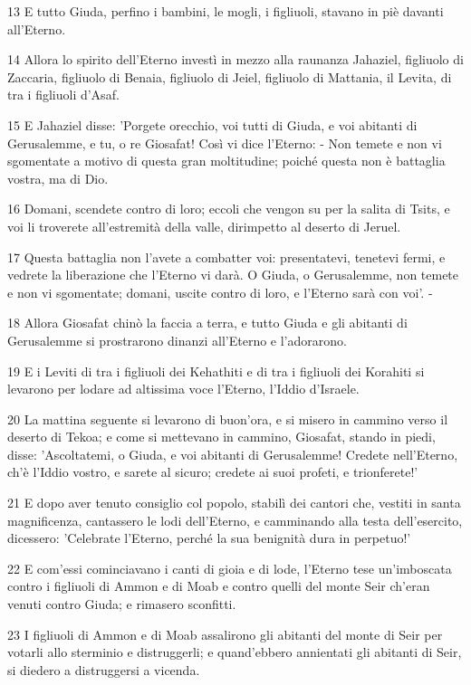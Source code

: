 \par 13 E tutto Giuda, perfino i bambini, le mogli, i figliuoli, stavano in piè davanti all'Eterno.
\par 14 Allora lo spirito dell'Eterno investì in mezzo alla raunanza Jahaziel, figliuolo di Zaccaria, figliuolo di Benaia, figliuolo di Jeiel, figliuolo di Mattania, il Levita, di tra i figliuoli d'Asaf.
\par 15 E Jahaziel disse: 'Porgete orecchio, voi tutti di Giuda, e voi abitanti di Gerusalemme, e tu, o re Giosafat! Così vi dice l'Eterno: - Non temete e non vi sgomentate a motivo di questa gran moltitudine; poiché questa non è battaglia vostra, ma di Dio.
\par 16 Domani, scendete contro di loro; eccoli che vengon su per la salita di Tsits, e voi li troverete all'estremità della valle, dirimpetto al deserto di Jeruel.
\par 17 Questa battaglia non l'avete a combatter voi: presentatevi, tenetevi fermi, e vedrete la liberazione che l'Eterno vi darà. O Giuda, o Gerusalemme, non temete e non vi sgomentate; domani, uscite contro di loro, e l'Eterno sarà con voi'. -
\par 18 Allora Giosafat chinò la faccia a terra, e tutto Giuda e gli abitanti di Gerusalemme si prostrarono dinanzi all'Eterno e l'adorarono.
\par 19 E i Leviti di tra i figliuoli dei Kehathiti e di tra i figliuoli dei Korahiti si levarono per lodare ad altissima voce l'Eterno, l'Iddio d'Israele.
\par 20 La mattina seguente si levarono di buon'ora, e si misero in cammino verso il deserto di Tekoa; e come si mettevano in cammino, Giosafat, stando in piedi, disse: 'Ascoltatemi, o Giuda, e voi abitanti di Gerusalemme! Credete nell'Eterno, ch'è l'Iddio vostro, e sarete al sicuro; credete ai suoi profeti, e trionferete!'
\par 21 E dopo aver tenuto consiglio col popolo, stabilì dei cantori che, vestiti in santa magnificenza, cantassero le lodi dell'Eterno, e camminando alla testa dell'esercito, dicessero: 'Celebrate l'Eterno, perché la sua benignità dura in perpetuo!'
\par 22 E com'essi cominciavano i canti di gioia e di lode, l'Eterno tese un'imboscata contro i figliuoli di Ammon e di Moab e contro quelli del monte Seir ch'eran venuti contro Giuda; e rimasero sconfitti.
\par 23 I figliuoli di Ammon e di Moab assalirono gli abitanti del monte di Seir per votarli allo sterminio e distruggerli; e quand'ebbero annientati gli abitanti di Seir, si diedero a distruggersi a vicenda.
